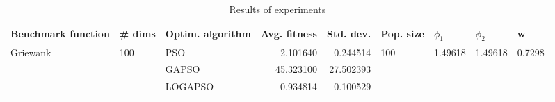 \begin{table}
\centering
\caption{Results of experiments}
\begin{tabular}{lllrrllll}
\toprule
       Benchmark function &              \# dims & Optim. algorithm &  Avg. fitness &  Std. dev. &            Pop. size &               $\phi_{1}$ &               $\phi_{2}$ &                       w \\
\midrule
\multirow{3}{*}{Griewank} & \multirow{3}{*}{100} &              PSO &      2.101640 &   0.244514 & \multirow{3}{*}{100} & \multirow{3}{*}{1.49618} & \multirow{3}{*}{1.49618} & \multirow{3}{*}{0.7298} \\
                          &                      &            GAPSO &     45.323100 &  27.502393 &                      &                          &                          &                         \\
                          &                      &          LOGAPSO &      0.934814 &   0.100529 &                      &                          &                          &                         \\
\bottomrule
\end{tabular}
\end{table}
